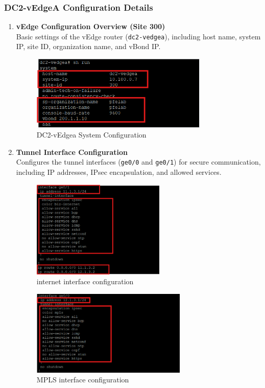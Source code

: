 \documentclass[12pt,english]{report}
\begin{document}
\subsubsection{DC2-vEdgeA Configuration Details}
\begin{enumerate}
    \item \textbf{vEdge Configuration Overview (Site 300)} \\
    Basic settings of the vEdge router (\texttt{dc2-vedgea}), including host name, system IP, site ID, organization name, and vBond IP.
\begin{figure}[H]
    \centering
    \includegraphics[width= 0.8\textwidth]{chapitre 3/2vedgea1.png}
    \caption{DC2-vEdgea System Configuration}
    \label{fig: DC2-vEdgea System Configuration}
\end{figure}
    \item \textbf{Tunnel Interface Configuration} \\
    Configures the tunnel interfaces (\texttt{ge0/0} and \texttt{ge0/1}) for secure communication, including IP addresses, IPsec encapsulation, and allowed services.
\begin{figure}[H]
    \centering
    \includegraphics[width= 0.6\textwidth]{chapitre 3/2vedgea4.png}
    \caption{internet interface configuration}
    \label{fig: internet interface configuration}
\end{figure}
\begin{figure}[H]
    \centering
    \includegraphics[width= 0.7\textwidth]{chapitre 3/2vedgea3.png}
    \caption{MPLS interface configuration}
    \label{fig: MPLS interface configuration}
\end{figure}
   


\end{enumerate}
\end{document}
